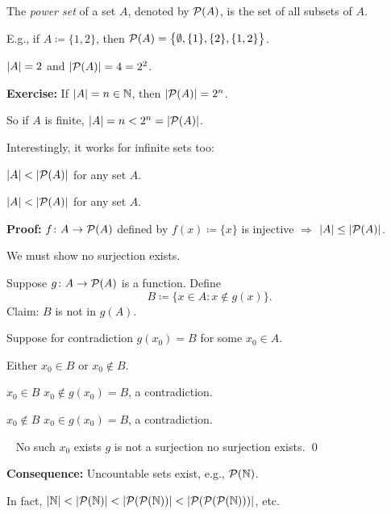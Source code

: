 \documentclass[10pt,aspectratio=169]{beamer}
\begin{document}
\begin{frame}

\begin{definition}
The \emph{power set} of a set $A$, denoted by ${\mathcal{P}}(A)$,
is the set of all subsets of $A$.
\end{definition}

\pause

E.g., if $A \coloneqq \{ 1,2\}$, then ${\mathcal{P}}(A) = \bigl\{ \emptyset, \{ 1 \}, \{ 2 \}, \{ 1, 2 \} \bigr\}$.

\pause
$\left\lvert {A} \right\rvert = 2$ and $\left\lvert {{\mathcal{P}}(A)} \right\rvert = 4 = 2^2$.

\medskip
\pause

\textbf{Exercise:} If $\left\lvert {A} \right\rvert = n \in {\mathbb{N}}$, then $\left\lvert {{\mathcal{P}}(A)} \right\rvert = 2^n$.

\medskip
\pause

So if $A$ is finite, $\left\lvert {A} \right\rvert = n < 2^n = \left\lvert {{\mathcal{P}}(A)} \right\rvert$.

\medskip
\pause

Interestingly, it works for infinite sets too:

\begin{theorem}[Cantor]
$\left\lvert {A} \right\rvert < \left\lvert {{\mathcal{P}}(A)} \right\rvert$ for any set $A$.
\end{theorem}

%

\end{frame}

\begin{frame}

\begin{theorem}[Cantor]
$\left\lvert {A} \right\rvert < \left\lvert {{\mathcal{P}}(A)} \right\rvert$ for any set $A$.
\end{theorem}

\pause

\textbf{Proof:}
$f \colon A \to {\mathcal{P}}(A)$ defined by
$f(x) \coloneqq \{ x \}$ is injective \pause $\Rightarrow$
$\left\lvert {A} \right\rvert \leq \left\lvert {{\mathcal{P}}(A)} \right\rvert$.

\medskip
\pause

We must show no surjection exists.

\pause

Suppose $g \colon A \to {\mathcal{P}}(A)$ is a function.
Define
\[
B \coloneqq \bigl\{ x \in A : x \notin g(x) \bigr\} .
\]
\pause
Claim: $B$ is not in $g(A)$.

\pause
Suppose for contradiction $g(x_0) = B$ for some $x_0 \in A$.

\pause
Either $x_0 \in B$ or $x_0 \notin B$.

\pause
$x_0 \in B$ \wthus $x_0 \notin g(x_0) = B$, \quad a contradiction.

\pause
$x_0 \notin B$ \wthus $x_0 \in g(x_0) = B$, \quad a contradiction.

\pause
\thus ~
No such $x_0$ exists
\pause
\wthus $g$ is not a surjection
\pause
\wthus no surjection exists.
\qed

\medskip
\pause

\textbf{Consequence:} Uncountable sets exist, e.g., ${\mathcal{P}}({\mathbb{N}})$.

\medskip
\pause

In fact,
$\left\lvert {{\mathbb{N}}} \right\rvert < \left\lvert {{\mathcal{P}}({\mathbb{N}})} \right\rvert < \left\lvert {{\mathcal{P}}({\mathcal{P}}({\mathbb{N}}))} \right\rvert < \left\lvert {{\mathcal{P}}({\mathcal{P}}({\mathcal{P}}({\mathbb{N}})))} \right\rvert$, etc.

\end{frame}
\end{document}
